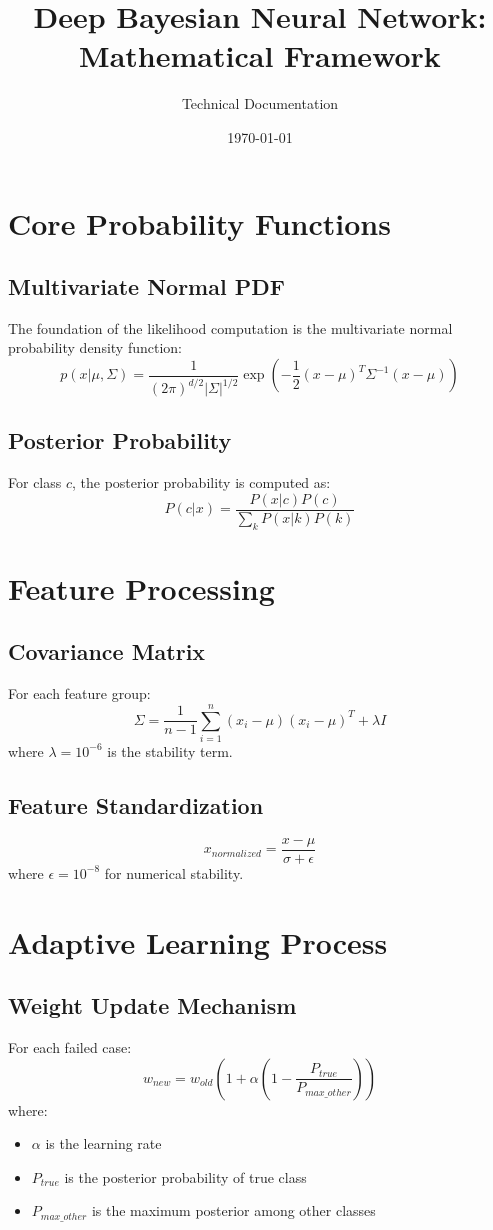 \documentclass[12pt]{article}
\title{Deep Bayesian Neural Network: Mathematical Framework}
\author{Technical Documentation}
\date{\today}
\begin{document}
\maketitle

\section{Core Probability Functions}

\subsection{Multivariate Normal PDF}
The foundation of the likelihood computation is the multivariate normal probability density function:
\[
p(x|\mu,\Sigma) = \frac{1}{(2\pi)^{d/2}|\Sigma|^{1/2}} \exp\left(-\frac{1}{2}(x-\mu)^T\Sigma^{-1}(x-\mu)\right)
\]

\subsection{Posterior Probability}
For class $c$, the posterior probability is computed as:
\[
P(c|x) = \frac{P(x|c)P(c)}{\sum_{k} P(x|k)P(k)}
\]

\section{Feature Processing}

\subsection{Covariance Matrix}
For each feature group:
\[
\Sigma = \frac{1}{n-1}\sum_{i=1}^n (x_i - \mu)(x_i - \mu)^T + \lambda I
\]
where $\lambda = 10^{-6}$ is the stability term.

\subsection{Feature Standardization}
\[
x_{normalized} = \frac{x - \mu}{\sigma + \epsilon}
\]
where $\epsilon = 10^{-8}$ for numerical stability.

\section{Adaptive Learning Process}

\subsection{Weight Update Mechanism}
For each failed case:
\[
w_{new} = w_{old}(1 + \alpha(1 - \frac{P_{true}}{P_{max\_other}}))
\]
where:
\begin{itemize}
\item $\alpha$ is the learning rate
\item $P_{true}$ is the posterior probability of true class
\item $P_{max\_other}$ is the maximum posterior among other classes
\end{itemize}
\end{document}

